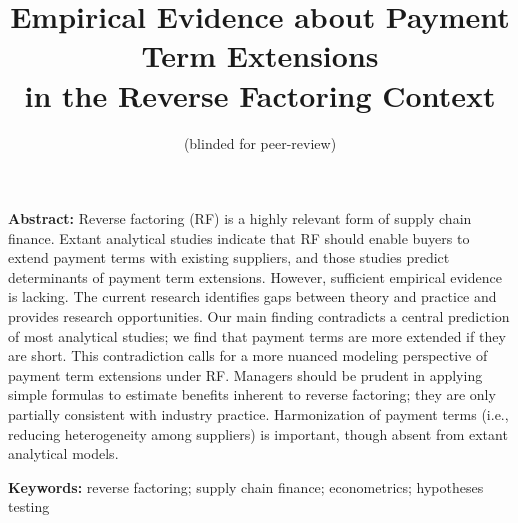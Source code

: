 \documentclass[A4,11pt]{article}
\title{Empirical Evidence about Payment Term Extensions\\ in the Reverse Factoring Context}
\date{}
\author{(blinded for peer-review)\vspace{-24pt}}
\renewcommand{\~}[1]{\tilde{#1}}
\renewcommand{\-}[1]{\overline{#1}}
\begin{document}
\maketitle%

\vspace{6pt}
\noindent%
\textbf{Abstract:} Reverse factoring (RF) is a highly relevant form of supply chain finance. Extant analytical studies indicate that RF should enable buyers to extend payment terms with existing suppliers, and those studies predict determinants of payment term extensions. However, sufficient empirical evidence is lacking. The current research identifies gaps between theory and practice and provides research opportunities. Our main finding contradicts a central prediction of most analytical studies; we find that payment terms are more extended if they are short. This contradiction calls for a more nuanced modeling perspective of payment term extensions under RF. Managers should be prudent in applying simple formulas to estimate benefits inherent to reverse factoring; they are only partially consistent with industry practice. Harmonization of payment terms (i.e., reducing heterogeneity among suppliers) is important, though absent from extant analytical models.\vspace{3pt}
%

\noindent%
\textbf{Keywords:} reverse factoring; supply chain finance; econometrics; hypotheses testing

\doublespacing

\end{document}
